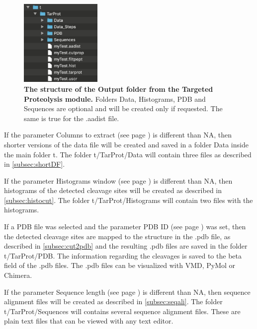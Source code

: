 \begin{figure}[h]
	\centering
	\includegraphics[width=0.35\textwidth]{./IMAGES/MOD-TARPROT/tarprot-files.jpg}	    
	\caption[The structure of the Output folder from the Targeted Proteolysis module]{\textbf{The structure of the Output folder from the Targeted Proteolysis module.} Folders Data, Histograms, PDB and Sequences are optional and will be created only if requested. The same is true for the .aadist file.} 
	\label{fig:enzdigFolder}
	\vspace{-5pt} 	
\end{figure} 

If the parameter Columns to extract (see page \pageref{par:enzdigColExt}) is different than NA, then shorter versions of the data file will be created and saved in a folder Data inside the main folder t. The folder t/TarProt/Data will\label{par:datafilesenzdig} contain three files as described in \autoref{subsec:shortDF}.

If the parameter Histograms window (see page \pageref{par:enzdigHist}) is different than NA, then histograms of the detected cleavage sites will be created as described in \autoref{subsec:histocut}. The folder t/TarProt/Histograms will contain two files with the histograms.

If a PDB file was selected and the parameter PDB ID  (see page \pageref{par:pdbID}) was set, then the detected cleavage sites are mapped to the structure in the .pdb file, as described in \autoref{subsec:cut2pdb} and the resulting .pdb files are saved in the folder t/TarProt/PDB. The information regarding the cleavages is saved to the beta field of the .pdb files. The .pdb files can be visualized with VMD, PyMol or Chimera. 
  
If the parameter Sequence length (see page \pageref{par:enzdigSeqL}) is different than NA, then sequence alignment files will be created as described in \autoref{subsec:seqali}. The folder t/TarProt/Sequences will contains several sequence alignment files. These are plain text files that can be viewed with any text editor.

